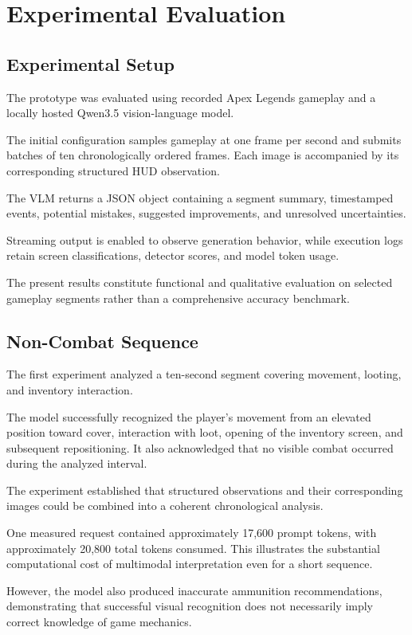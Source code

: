 \documentclass[10pt,letterpaper]{article}
\begin{document}
\section{Experimental Evaluation}

\subsection{Experimental Setup}

The prototype was evaluated using recorded Apex Legends
gameplay and a locally hosted Qwen3.5 vision-language
model.

The initial configuration samples gameplay at one frame
per second and submits batches of ten chronologically
ordered frames. Each image is accompanied by its
corresponding structured HUD observation.

The VLM returns a JSON object containing a segment summary,
timestamped events, potential mistakes, suggested
improvements, and unresolved uncertainties.

Streaming output is enabled to observe generation behavior,
while execution logs retain screen classifications,
detector scores, and model token usage.

The present results constitute functional and qualitative
evaluation on selected gameplay segments rather than a
comprehensive accuracy benchmark.

\subsection{Non-Combat Sequence}

The first experiment analyzed a ten-second segment
covering movement, looting, and inventory interaction.

The model successfully recognized the player's movement
from an elevated position toward cover, interaction with
loot, opening of the inventory screen, and subsequent
repositioning. It also acknowledged that no visible
combat occurred during the analyzed interval.

The experiment established that structured observations
and their corresponding images could be combined into
a coherent chronological analysis.

One measured request contained approximately 17,600
prompt tokens, with approximately 20,800 total tokens
consumed. This illustrates the substantial computational
cost of multimodal interpretation even for a short
sequence.

However, the model also produced inaccurate ammunition
recommendations, demonstrating that successful visual
recognition does not necessarily imply correct knowledge
of game mechanics.
\end{document}
